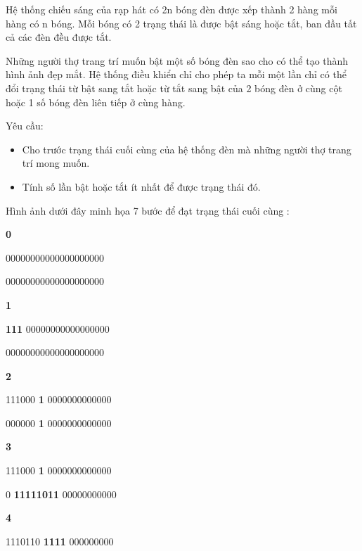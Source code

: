 Hệ thống chiếu sáng của rạp hát có 2n bóng đèn được xếp thành 2 hàng mỗi hàng có n bóng. Mỗi bóng có 2 trạng thái là được bật sáng hoặc tắt, ban đầu tất cả các đèn đều được tắt.  

   Những người thợ trang trí muốn bật một số bóng đèn sao cho có thể tạo thành hình ảnh đẹp mắt. Hệ thống điều khiển chỉ cho phép ta mỗi một lần chỉ có thể đổi trạng thái từ bật sang tắt hoặc từ tắt sang bật của 2 bóng đèn ở cùng cột hoặc 1 số bóng đèn liên tiếp ở cùng hàng.  

Yêu cầu:
\begin{itemize}
	\item     Cho trước trạng thái cuối cùng của hệ thống đèn mà những người thợ trang trí mong muốn.   
	\item     Tính số lần bật hoặc tắt ít nhất để được trạng thái đó.   
\end{itemize}









   Hình ảnh dưới đây minh họa 7 bước để đạt trạng thái cuối cùng :  



\textbf{          0         }

         00000000000000000000                          

         00000000000000000000                          

\textbf{          1         }

\textbf{          111         }         00000000000000000                          

         00000000000000000000                          

\textbf{          2         }

         111000         \textbf{          1         }         0000000000000                          

         000000         \textbf{          1         }         0000000000000                          

\textbf{          3         }

         111000         \textbf{          1         }         0000000000000        

         0         \textbf{          11111011         }         00000000000                          

\textbf{          4         }

         1110110         \textbf{          1111         }         000000000                          

